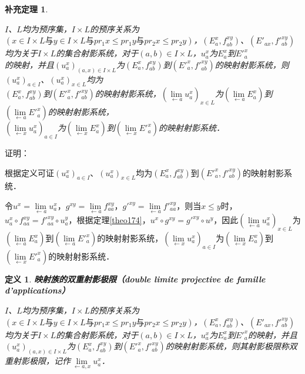 \documentclass[12pt, a4paper, oneside]{book}
\newtheorem{cor}{补充定理}
\newtheorem{de}{定义}
\begin{document}
			\begin{cor}\label{cor421}
				\hfill\par
				$I$、$L$均为预序集，$I\times L$的预序关系为$(x\in I\times L\text{与}y\in I\times L\text{与}pr_1x\leq pr_1y\text{与}pr_2x\leq pr_2y)$，$(E_a^x, f_{ab}^{xy})$、$({E'}_{ax}, {f'}_{ab}^{xy})$均为关于$I\times L$的集合射影系统，对于$(a, b)\in I\times L$，$u_a^x$为$E_a^x$到${E'}_a^x$\\的映射，并且$(u_a^x)_{(a, x)\in I\times L}$为$(E_a^x, f_{ab}^{xy})$到$({E'}_a^x, {f'}_{ab}^{xy})$的映射射影系统，则$(u_a^x)_{a\in I}$、$(u_a^x)_{x\in L}$均为\\$(E_a^x, f_{ab}^{xy})$到$({E'}_a^x, {f'}_{ab}^{xy})$的映射射影系统，$(\lim\limits_{\gets a}u_a^x)_{x\in L}$为$(\lim\limits_{\gets a}E_a^x)$到$(\lim\limits_{\gets a}{E'}_a^x)$的映射射影系统，\\$(\lim\limits_{\gets x}u_a^x)_{a\in I}$为$(\lim\limits_{\gets x}E_a^x)$到$(\lim\limits_{\gets x}{E'}_a^x)$的映射射影系统．
			\end{cor}
			证明：
			\par
			根据定义可证$(u_a^x)_{a\in I}$、$(u_a^x)_{x\in L}$均为$(E_a^x, f_{ab}^{xy})$到$({E'}_a^x, {f'}_{ab}^{xy})$的映射射影系统．
			\par
			令$u^x=\lim\limits_{\gets a}u_a^x$，$g^{xy}=\lim\limits_{\gets a}f_{aa}^{xy}$，${g'}^{xy}=\lim\limits_{\gets a}{f'}_{aa}^{xy}$，则当$x\leq y$时，$u_a^x\circ f_{aa}^{xy}={f'}_{aa}^{xy}\circ u_a^y$，根据定理\ref{theo174}，$u^x\circ g^{xy}={g'}^{xy}\circ u^y$，因此$(\lim\limits_{\gets a}u_a^x)_{x\in L}$为$(\lim\limits_{\gets a}E_a^x)$到$(\lim\limits_{\gets a}{E'}_a^x)$的映射射影系统，$(\lim\limits_{\gets x}u_a^x)_{a\in I}$为$(\lim\limits_{\gets x}E_a^x)$到$(\lim\limits_{\gets x}{E'}_a^x)$的映射射影系统．
			
			\begin{de}
				\textbf{映射族的双重射影极限（double limite projective de famille \\d'applications）}
				\par
				$I$、$L$均为预序集，$I\times L$的预序关系为$(x\in I\times L\text{与}y\in I\times L\text{与}pr_1x\leq pr_1y\text{与}pr_2x\leq pr_2y)$，$(E_a^x, f_{ab}^{xy})$、$({E'}_{ax}, {f'}_{ab}^{xy})$均为关于$I\times L$的集合射影系统，对于$(a, b)\in I\times L$，$u_a^x$为$E_a^x$到${E'}_a^x$的映射，并且$(u_a^x)_{(a, x)\in I\times L}$为$(E_a^x, f_{ab}^{xy})$到$({E'}_a^x, {f'}_{ab}^{xy})$的映射射影系统，则其射影极限称双重射影极限，记作$\lim\limits_{\gets a, x}u_a^x$．
			\end{de}
					
\end{document}
